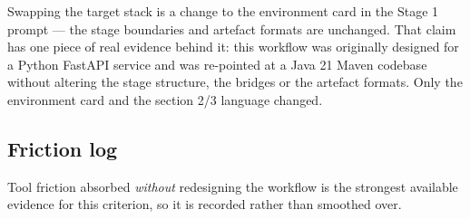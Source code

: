 \documentclass[11pt,a4paper]{article}
\begin{document}
Swapping the target stack is a change to the environment card in the Stage 1
prompt --- the stage boundaries and artefact formats are unchanged. That claim
has one piece of real evidence behind it: this workflow was originally designed
for a Python FastAPI service and was re-pointed at a Java 21 Maven codebase
without altering the stage structure, the bridges or the artefact formats. Only
the environment card and the section 2/3 language changed.

\subsection{Friction log}

Tool friction absorbed \emph{without} redesigning the workflow is the strongest
available evidence for this criterion, so it is recorded rather than smoothed
over.
\end{document}
